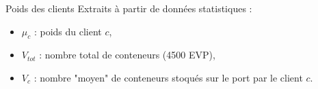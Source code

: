 \begin{frame}{Poids des clients}
  Extraits à partir de données statistiques : 
  \begin{itemize}
    \vfill
  \item $\mu_c$ : poids du client $c$,
    \vfill
  \item $V_{tot}$ : nombre total de conteneurs (4500 EVP),
    \vfill
  \item  $V_c$ : nombre "moyen" de conteneurs stoqués sur le port par le client $c$.
  \end{itemize}
  \vfill
\end{frame} 




